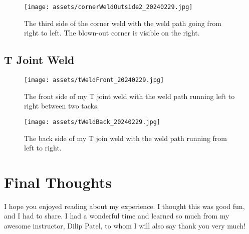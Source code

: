\documentclass{article}
\begin{document}
\begin{figure}[h]
\caption{The third side of the corner weld with the weld path going from right to left. The blown-out corner is visible on the right.}
\texttt{[image: assets/cornerWeldOutside2\_20240229.jpg]}
\end{figure}

\subsection*{T Joint Weld}

\begin{figure}[h]
\caption{The front side of my T joint weld with the weld path running left to right between two tacks.}
\texttt{[image: assets/tWeldFront\_20240229.jpg]}
\end{figure}

\begin{figure}[h]
\caption{The back side of my T join weld with the weld path running from left to right.}
\texttt{[image: assets/tWeldBack\_20240229.jpg]}
\end{figure}

\section*{Final Thoughts}

I hope you enjoyed reading about my experience. I thought this was good fun, and I had to share. I had a wonderful time and learned so much from my awesome instructor, Dilip Patel, to whom I will also say thank you very much!
\end{document}
